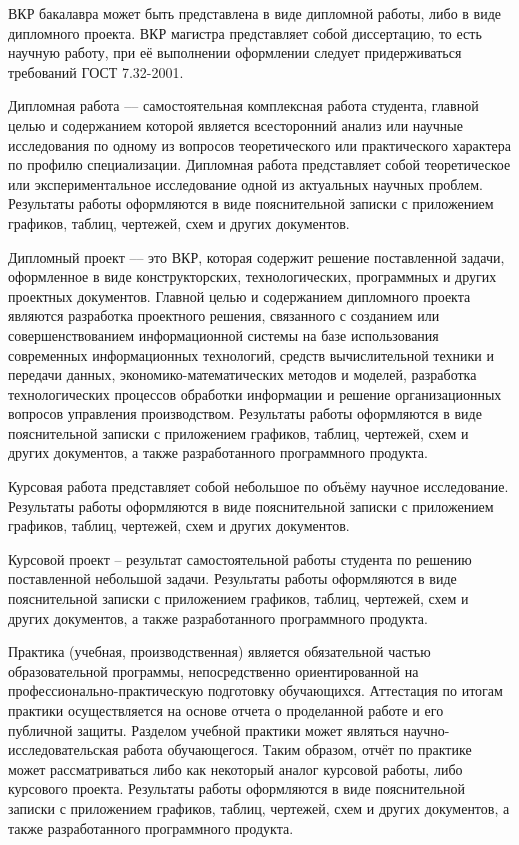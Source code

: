 ВКР бакалавра может быть представлена в виде дипломной работы, либо в виде
дипломного проекта. ВКР магистра представляет собой диссертацию, то есть научную работу,
при её выполнении оформлении следует придерживаться требований ГОСТ 7.32-2001.

Дипломная работа –-- самостоятельная комплексная работа студента, главной целью и
содержанием которой является всесторонний анализ или научные исследования по одному из
вопросов теоретического или практического характера по профилю специализации. Дипломная
работа представляет собой теоретическое или экспериментальное исследование одной из
актуальных научных проблем. Результаты работы оформляются в виде пояснительной записки с
приложением графиков, таблиц, чертежей, схем и других документов.

Дипломный проект –-- это ВКР, которая содержит решение поставленной задачи,
оформленное в виде конструкторских, технологических, программных и других проектных
документов. Главной целью и содержанием дипломного проекта являются разработка
проектного решения, связанного с созданием или совершенствованием информационной
системы на базе использования современных информационных технологий, средств
вычислительной техники и передачи данных, экономико-математических методов и моделей,
разработка технологических процессов обработки информации и решение организационных
вопросов управления производством. Результаты работы оформляются в виде пояснительной
записки с приложением графиков, таблиц, чертежей, схем и других документов, а также
разработанного программного продукта.

Курсовая работа представляет собой небольшое по объёму научное исследование.
Результаты работы оформляются в виде пояснительной записки с приложением графиков,
таблиц, чертежей, схем и других документов.

Курсовой проект – результат самостоятельной работы студента по решению
поставленной небольшой задачи. Результаты работы оформляются в виде пояснительной
записки с приложением графиков, таблиц, чертежей, схем и других документов, а также
разработанного программного продукта.

Практика (учебная, производственная) является обязательной частью образовательной
программы, непосредственно ориентированной на профессионально-практическую подготовку
обучающихся. Аттестация по итогам практики осуществляется на основе отчета о проделанной
работе и его публичной защиты. Разделом учебной практики может являться научно-
исследовательская работа обучающегося. Таким образом, отчёт по практике может
рассматриваться либо как некоторый аналог курсовой работы, либо курсового проекта.
Результаты работы оформляются в виде пояснительной записки с приложением графиков,
таблиц, чертежей, схем и других документов, а также разработанного программного продукта.

